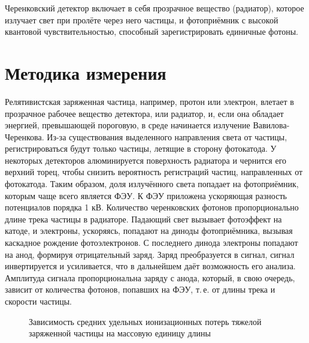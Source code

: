 \documentclass[12pt,a4paper]{report} %
\begin{document}
Черенковский детектор включает в себя прозрачное вещество (радиатор), которое излучает свет при пролёте через него частицы, и фотоприёмник с высокой квантовой чувствительностью, способный зарегистрировать единичные фотоны. 

\section{Методика измерения}

Релятивистская заряженная частица, например, протон или электрон, влетает в прозрачное рабочее вещество детектора, или радиатор, и, если она обладает энергией, превышающей пороговую, в среде начинается излучение Вавилова-Черенкова.
Из-за существования выделенного направления света от частицы, регистрироваться будут только частицы, летящие в сторону фотокатода.
У некоторых детекторов алюминируется поверхность радиатора и чернится его верхний торец, чтобы снизить вероятность регистраций частиц, направленных от фотокатода.
Таким образом, доля излучённого света попадает на фотоприёмник, которым чаще всего является ФЭУ. 
К ФЭУ приложена ускоряющая разность потенциалов порядка 1 кВ. 
Количество черенковских фотонов пропорционально длине трека частицы в радиаторе. 
Падающий свет вызывает фотоэффект на катоде, и электроны, ускоряясь, попадают на диноды фотоприёмника, вызывая каскадное рождение фотоэлектронов. 
С последнего динода электроны попадают на анод, формируя отрицательный заряд. 
Заряд преобразуется в сигнал, сигнал инвертируется и усиливается, что в дальнейшем даёт возможность его анализа. Амплитуда сигнала пропорциональна заряду с анода, который, в свою очередь, зависит от количества фотонов, попавших на ФЭУ, т.\,е. от длины трека и скорости частицы.
\begin{figure}[th]
	\noindent{}
	\caption{Зависимость средних удельных ионизационных потерь тяжелой заряженной частицы на массовую единицу длины}
	\label{pic:BetheBlokh}
\end{figure}
\end{document}
